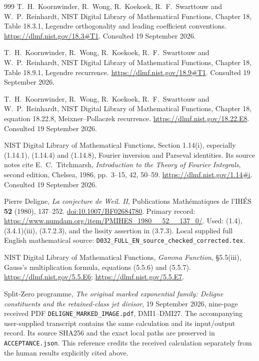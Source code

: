\begin{thebibliography}{999}
T.\ H.\ Koornwinder, R.\ Wong, R.\ Koekoek, R.\ F.\ Swarttouw
and W.\ P.\ Reinhardt,
NIST Digital Library of Mathematical Functions,
Chapter 18, Table 18.3.1, Legendre orthogonality and leading
coefficient conventions.
\url{https://dlmf.nist.gov/18.3#T1}.
Consulted 19 September 2026.

T.\ H.\ Koornwinder, R.\ Wong, R.\ Koekoek, R.\ F.\ Swarttouw
and W.\ P.\ Reinhardt,
NIST Digital Library of Mathematical Functions,
Chapter 18, Table 18.9.1, Legendre recurrence.
\url{https://dlmf.nist.gov/18.9#T1}.
Consulted 19 September 2026.

T.\ H.\ Koornwinder, R.\ Wong, R.\ Koekoek, R.\ F.\ Swarttouw
and W.\ P.\ Reinhardt,
NIST Digital Library of Mathematical Functions,
Chapter 18, equation 18.22.8, Meixner--Pollaczek recurrence.
\url{https://dlmf.nist.gov/18.22.E8}.
Consulted 19 September 2026.

NIST Digital Library of Mathematical Functions,
Section 1.14(i), especially (1.14.1), (1.14.4) and (1.14.8),
Fourier inversion and Parseval identities.
Its source notes cite E.\ C.\ Titchmarsh,
\emph{Introduction to the Theory of Fourier Integrals},
second edition, Chelsea, 1986, pp.\ 3--15, 42, 50--59.
\url{https://dlmf.nist.gov/1.14#i}.
Consulted 19 September 2026.

Pierre Deligne, \emph{La conjecture de Weil. II}, Publications
Math\'ematiques de l'IH\'ES \textbf{52} (1980), 137--252.
\href{https://doi.org/10.1007/BF02684780}{doi:10.1007/BF02684780}.
Primary record:
\url{https://www.numdam.org/item/PMIHES_1980__52__137_0/}.
Used: (1.4), (3.4.1)(iii), (3.7.2.3), and the lissity assertion
in (3.7.3). Local supplied full English mathematical source:
\texttt{D032\_FULL\_EN\_source\_checked\_corrected.tex}.

NIST Digital Library of Mathematical Functions,
\emph{Gamma Function}, \S5.5(iii), Gauss's multiplication formula,
equations (5.5.6) and (5.5.7).
\url{https://dlmf.nist.gov/5.5.E6};
\url{https://dlmf.nist.gov/5.5.E7}.

Split-Zero programme, \emph{The original marked exponential family:
Deligne constituents and the retained-class jet divisor},
19 September 2026, nine-page received PDF
\texttt{DELIGNE\_MARKED\_IMAGE.pdf}, DMI1--DMI27.
The accompanying user-supplied transcript contains the same
calculation and its input/output record. Its source SHA256 and
the exact local paths are preserved in \texttt{ACCEPTANCE.json}.
This reference credits the received calculation separately from
the human results explicitly cited above.


\end{thebibliography}
